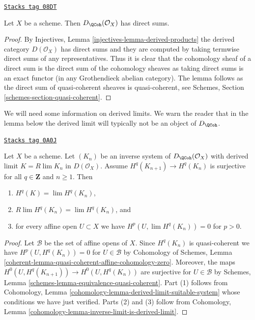 \begin{lemma}
\label{perfect-lemma-quasi-coherence-direct-sums}
\href{https://stacks.math.columbia.edu/tag/08DT}{\texttt{Stacks tag 08DT}}

Let $X$ be a scheme. Then $D_\QCoh(\mathcal{O}_X)$
has direct sums.
\end{lemma}

\begin{proof}
By Injectives, Lemma \ref{injectives-lemma-derived-products}
the derived category $D(\mathcal{O}_X)$ has direct sums and
they are computed by taking termwise direct sums of any representatives.
Thus it is clear that the cohomology sheaf of a direct sum is the
direct sum of the cohomology sheaves as taking direct sums is
an exact functor (in any Grothendieck abelian category). The lemma
follows as the direct sum of quasi-coherent sheaves is quasi-coherent, see
Schemes, Section \ref{schemes-section-quasi-coherent}.
\end{proof}

We will need some information on derived limits. We warn the reader
that in the lemma below the derived limit will typically not be
an object of $D_\QCoh$.

\begin{lemma}
\label{perfect-lemma-Rlim-quasi-coherent}
\href{https://stacks.math.columbia.edu/tag/0A0J}{\texttt{Stacks tag 0A0J}}

Let $X$ be a scheme. Let $(K_n)$ be an inverse system of
$D_\QCoh(\mathcal{O}_X)$ with derived limit
$K = R\lim K_n$ in $D(\mathcal{O}_X)$. Assume $H^q(K_{n + 1}) \to H^q(K_n)$
is surjective for all $q \in \mathbf{Z}$ and $n \geq 1$.
Then
\begin{enumerate}
\item $H^q(K) = \lim H^q(K_n)$,
\item $R\lim H^q(K_n) = \lim H^q(K_n)$, and
\item for every affine open $U \subset X$ we have
$H^p(U, \lim H^q(K_n)) = 0$ for $p > 0$.
\end{enumerate}
\end{lemma}

\begin{proof}
Let $\mathcal{B}$ be the set of affine opens of $X$.
Since $H^q(K_n)$ is quasi-coherent we have $H^p(U, H^q(K_n)) = 0$
for $U \in \mathcal{B}$ by Cohomology of Schemes, Lemma
\ref{coherent-lemma-quasi-coherent-affine-cohomology-zero}.
Moreover, the maps $H^0(U, H^q(K_{n + 1})) \to H^0(U, H^q(K_n))$
are surjective for $U \in \mathcal{B}$ by
Schemes, Lemma \ref{schemes-lemma-equivalence-quasi-coherent}.
Part (1) follows from Cohomology, Lemma
\ref{cohomology-lemma-derived-limit-suitable-system}
whose conditions we have just verified.
Parts (2) and (3) follow from
Cohomology, Lemma \ref{cohomology-lemma-inverse-limit-is-derived-limit}.
\end{proof}

